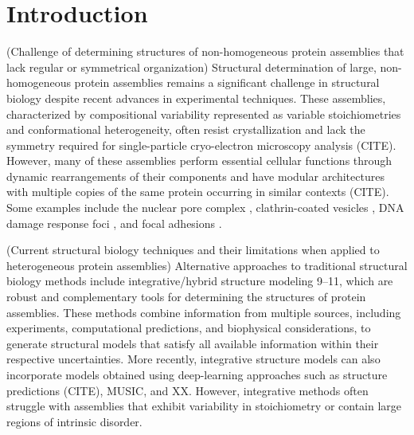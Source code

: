\documentclass[journal=jcim,manuscript=article]{achemso}
\newcommand{\ignacia}[1]{%
    \textcolor{ignacia} {#1}%
}
\begin{document}
\section{Introduction}\label{sec1}

(Challenge of determining structures of non-homogeneous protein assemblies that lack regular or symmetrical organization) Structural determination of large, non-homogeneous protein assemblies remains a significant challenge in structural biology despite recent advances in experimental techniques. These assemblies, characterized by compositional variability represented as variable stoichiometries and conformational heterogeneity, often resist crystallization and lack the symmetry required for single-particle cryo-electron microscopy analysis \cite{Topf08Structure16p295} (CITE). However, many of these assemblies perform essential cellular functions through dynamic rearrangements of their components and have modular architectures with multiple copies of the same protein occurring in similar contexts (CITE). \cite{Boeckers06CellandTissuep409,Devos06PNAS103p2172} Some examples include the nuclear pore complex \cite{Alber07Nature450p695}, clathrin-coated vesicles \cite{Devos04PLOSBiology2p380}, DNA damage response foci \cite{Polo11GenesDev25p409}, and focal adhesions \cite{Geiger01NatRevMolCellBiol2p793,Mishra21CellSignal85p110046}.

(Current structural biology techniques and their limitations when applied to heterogeneous protein assemblies) \ignacia{Alternative approaches to traditional structural biology methods include} integrative/hybrid structure modeling 9–11, which are robust and complementary tools for determining the structures of protein assemblies. These methods combine information from multiple sources, including experiments, computational predictions, and biophysical considerations, to generate structural models that satisfy all available information within their respective uncertainties. More recently, integrative structure models can also incorporate models obtained using deep-learning approaches such as structure predictions \cite{Stahl23NatBiotechnol41p1810} (CITE), MUSIC, and XX. However, integrative methods often struggle with assemblies that exhibit variability in stoichiometry or contain large regions of intrinsic disorder.  
\end{document}
